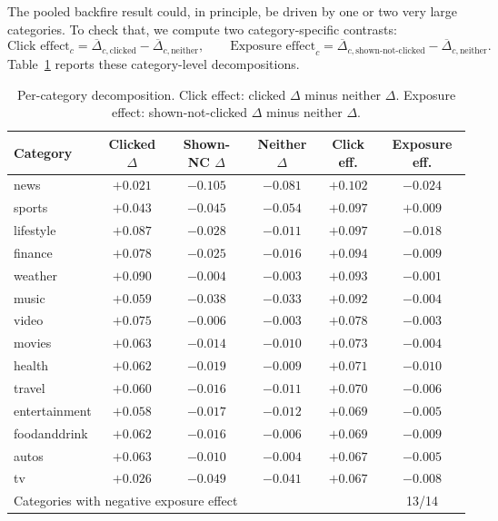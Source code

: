 \documentclass[11pt]{article}
\begin{document}
The pooled backfire result could, in principle, be driven by one or two very large categories. To check that, we compute two category-specific contrasts:
\[
\text{Click effect}_c
=
\overline{\Delta}_{c,\text{clicked}}
-
\overline{\Delta}_{c,\text{neither}},
\qquad
\text{Exposure effect}_c
=
\overline{\Delta}_{c,\text{shown-not-clicked}}
-
\overline{\Delta}_{c,\text{neither}}.
\]
Table~\ref{tab:exposure_percat} reports these category-level decompositions.

\begin{table}[ht]
\centering
\caption{Per-category decomposition. Click effect: clicked $\Delta$ minus neither $\Delta$. Exposure effect: shown-not-clicked $\Delta$ minus neither $\Delta$.}
\label{tab:exposure_percat}
\small
\begin{tabular}{lccccc}
\toprule
Category & Clicked $\Delta$ & Shown-NC $\Delta$ & Neither $\Delta$ & Click eff. & Exposure eff. \\
\midrule
news & $+0.021$ & $-0.105$ & $-0.081$ & $+0.102$ & $-0.024$ \\
sports & $+0.043$ & $-0.045$ & $-0.054$ & $+0.097$ & $+0.009$ \\
lifestyle & $+0.087$ & $-0.028$ & $-0.011$ & $+0.097$ & $-0.018$ \\
finance & $+0.078$ & $-0.025$ & $-0.016$ & $+0.094$ & $-0.009$ \\
weather & $+0.090$ & $-0.004$ & $-0.003$ & $+0.093$ & $-0.001$ \\
music & $+0.059$ & $-0.038$ & $-0.033$ & $+0.092$ & $-0.004$ \\
video & $+0.075$ & $-0.006$ & $-0.003$ & $+0.078$ & $-0.003$ \\
movies & $+0.063$ & $-0.014$ & $-0.010$ & $+0.073$ & $-0.004$ \\
health & $+0.062$ & $-0.019$ & $-0.009$ & $+0.071$ & $-0.010$ \\
travel & $+0.060$ & $-0.016$ & $-0.011$ & $+0.070$ & $-0.006$ \\
entertainment & $+0.058$ & $-0.017$ & $-0.012$ & $+0.069$ & $-0.005$ \\
foodanddrink & $+0.062$ & $-0.016$ & $-0.006$ & $+0.069$ & $-0.009$ \\
autos & $+0.063$ & $-0.010$ & $-0.004$ & $+0.067$ & $-0.005$ \\
tv & $+0.026$ & $-0.049$ & $-0.041$ & $+0.067$ & $-0.008$ \\
\midrule
\multicolumn{5}{l}{Categories with negative exposure effect} & 13/14 \\
\bottomrule
\end{tabular}
\end{table}
\FloatBarrier
\end{document}
